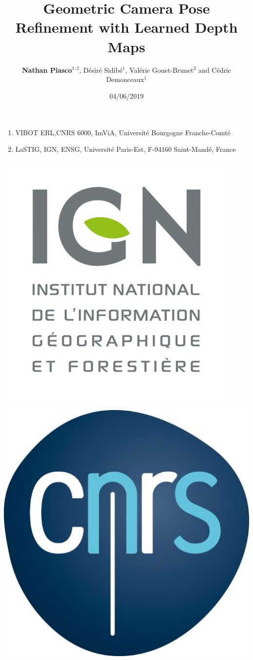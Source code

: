 \documentclass[9pt, aspectratio=169]{beamer}
\title{Geometric Camera Pose Refinement with Learned Depth Maps}
\author{\textbf{Nathan Piasco$^{1,2}$}, Désiré Sidibé$^{1}$, Valérie Gouet-Brunet$^{2}$ and Cédric Demonceaux$^{1}$}
\institute{pLaTINUM metting, Paris} %
\date{04/06/2019}
\begin{document}
\begin{frame}[plain,c]
	\titlepage
	\begin{minipage}{0.49\textwidth}
	\footnotesize
	\centering
		\begin{enumerate}
			\item VIBOT ERL,CNRS  6000,  ImViA, Universit\'e  Bourgogne Franche-Comt\'e
			\item LaSTIG, IGN, ENSG, Universit\'e Paris-Est, 	F-94160 Saint-Mand\'e, France
		\end{enumerate}
	\end{minipage}\hfill
	\begin{minipage}{0.49\textwidth}
	\centering
	{
	\begin{minipage}{0.45\linewidth}
			\centering
			\includegraphics[width=0.5\linewidth]{images/logos/ign_logo}
	\end{minipage}\hfill
	\begin{minipage}{0.45\linewidth}
			\centering
			\includegraphics[width=0.5\linewidth]{images/logos/cnrs}
	\end{minipage}

	\vfill
	
}
\end{minipage}
\end{frame}
\end{document}
